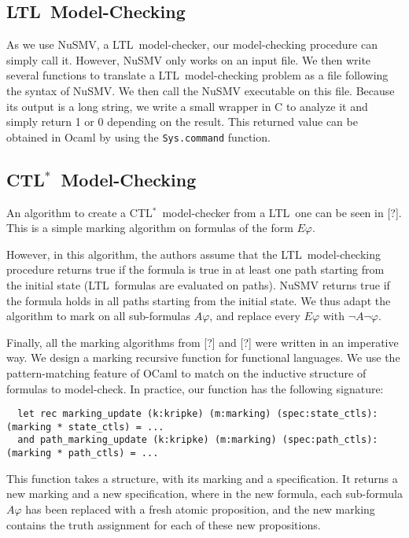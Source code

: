 \documentclass[dvipsnames]{acmart}
\def\ctls{CTL$^{*}$}
\def\ltl{LTL}
\def\A{\mathit{A}}
\def\E{\mathit{E}}
\begin{document}
\subsection{\ltl\ Model-Checking}
As we use NuSMV, a \ltl\ model-checker, our model-checking procedure can simply call it.
However, NuSMV only works on an input file. We then write several functions to translate a \ltl\ model-checking problem as a file following the syntax of NuSMV.
We then call the NuSMV executable on this file. Because its output is a long string, we write a small wrapper in C to analyze it and simply return 1 or 0 depending on the result. This returned value can be obtained in Ocaml by using the \lstinline{Sys.command} function.

\subsection{\ctls\ Model-Checking}
An algorithm to create a \ctls\ model-checker from a \ltl\ one can be seen in [?].
This is a simple marking algorithm on formulas of the form $\E\varphi$.

However, in this algorithm, the authors assume that the \ltl\ model-checking procedure returns true if the formula is true in at least one path starting from the initial state (\ltl\ formulas are evaluated on paths).
NuSMV returns true if the formula holds in all paths starting from the initial state.
We thus adapt the algorithm to mark on all sub-formulas $\A\varphi$, and replace every $\E\varphi$ with $\neg\A\neg\varphi$.

Finally, all the marking algorithms from [?] and [?] were written in an imperative way.
We design a marking recursive function for functional languages.
We use the pattern-matching feature of OCaml to match on the inductive structure of formulas to model-check.
In practice, our function has the following signature:

\begin{lstlisting}
  let rec marking_update (k:kripke) (m:marking) (spec:state_ctls): (marking * state_ctls) = ...
  and path_marking_update (k:kripke) (m:marking) (spec:path_ctls): (marking * path_ctls) = ...
\end{lstlisting}

This function takes a structure, with its marking and a specification. It returns a new marking and a new specification, where in the new formula, each sub-formula $\A\varphi$ has been replaced with a fresh atomic proposition, and the new marking contains the truth assignment for each of these new propositions.
\end{document}
